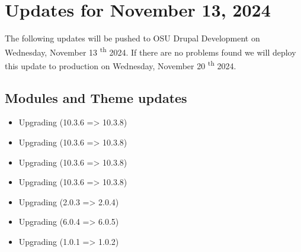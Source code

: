 \section{Updates for November 13, 2024}
The following updates will be pushed to OSU Drupal Development on Wednesday, November 13 \textsuperscript{th} 2024.
If there are no problems found we will deploy this update to production on Wednesday, November 20 \textsuperscript{th} 2024.
\subsection{Modules and Theme updates}
\begin{itemize}
    \item Upgrading  (10.3.6 => 10.3.8)
    \item Upgrading  (10.3.6 => 10.3.8)
    \item Upgrading  (10.3.6 => 10.3.8)
    \item Upgrading  (10.3.6 => 10.3.8)
    \item Upgrading  (2.0.3 => 2.0.4)
    \item Upgrading  (6.0.4 => 6.0.5)
    \item Upgrading  (1.0.1 => 1.0.2)
\end{itemize}
